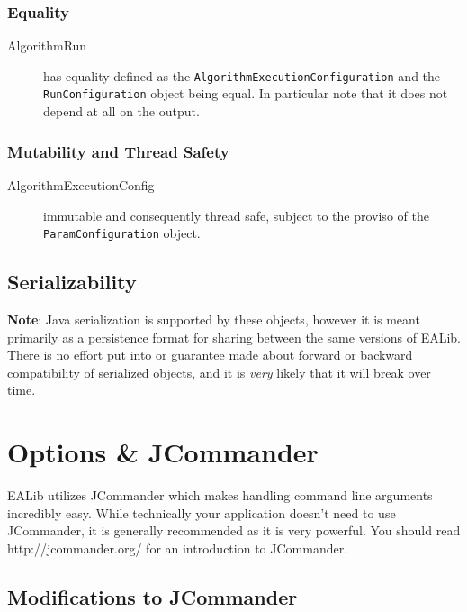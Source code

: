 \documentclass[11pt,letterpaper,oneside]{article}
\begin{document}
\subsubsection{Equality}
\begin{description}
\item[AlgorithmRun] has equality defined as the \texttt{AlgorithmExecutionConfiguration} 
and the \\
\texttt{RunConfiguration} object being equal. In particular note that it does not depend at all on the output. 
\end{description}

\subsubsection{Mutability and Thread Safety}
\begin{description}
\item[AlgorithmExecutionConfig] immutable and consequently thread safe, subject to the proviso of the \\
\texttt{ParamConfiguration} object.
\end{description}

\subsection{Serializability}

\textbf{Note}: Java serialization is supported by these objects, however it is meant primarily as a persistence format for sharing between the same versions of EALib. There is no effort put into or guarantee made about forward or backward compatibility of serialized objects, and it is \emph{very} likely that it will break over time.

\section{Options \& JCommander}

EALib utilizes JCommander which makes handling command line arguments incredibly easy. While technically your application doesn't need to use JCommander, it is generally recommended as it is very powerful. You should read http://jcommander.org/ for an introduction to JCommander.





\subsection{Modifications to JCommander}
\end{document}
